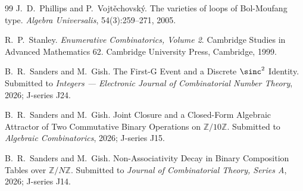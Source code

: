 \documentclass[11pt,reqno]{amsart}
\theoremstyle{plain}
\theoremstyle{definition}
\theoremstyle{remark}
\newcommand{\Z}{\mathbb{Z}}
\begin{document}
\begin{thebibliography}{99}
J.~D.~Phillips and P.~Vojt\v{e}chovsk\'y.
\newblock The varieties of loops of Bol-Moufang type.
\newblock \emph{Algebra Universalis}, 54(3):259--271, 2005.

R.~P.~Stanley.
\newblock \emph{Enumerative Combinatorics, Volume 2}.
\newblock Cambridge Studies in Advanced Mathematics 62.
\newblock Cambridge University Press, Cambridge, 1999.

B.~R.~Sanders and M.~Gish.
\newblock The First-G Event and a Discrete $\sinc^{2}$ Identity.
\newblock Submitted to \emph{Integers --- Electronic Journal of
Combinatorial Number Theory}, 2026; J-series J24.

B.~R.~Sanders and M.~Gish.
\newblock Joint Closure and a Closed-Form Algebraic Attractor of Two
Commutative Binary Operations on $\Z/10\Z$.
\newblock Submitted to \emph{Algebraic Combinatorics}, 2026;
J-series J15.

B.~R.~Sanders and M.~Gish.
\newblock Non-Associativity Decay in Binary Composition Tables over
$\Z/N\Z$.
\newblock Submitted to \emph{Journal of Combinatorial Theory,
Series A}, 2026; J-series J14.

\end{thebibliography}
\end{document}
